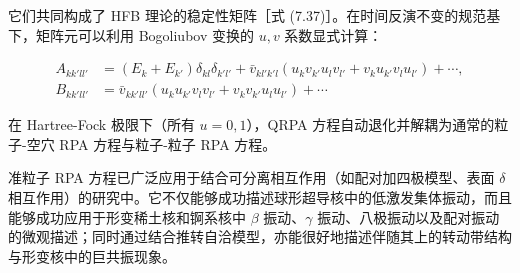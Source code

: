 它们共同构成了 HFB 理论的稳定性矩阵［式 (7.37)］。在时间反演不变的规范基下，矩阵元可以利用 Bogoliubov 变换的
$u,v$ 系数显式计算：

\begin{align}
A_{kk'll'} & =(E_{k}+E_{k'})\delta_{kl}\delta_{k'l'}+\bar{v}_{kl'k'l}(u_{k}v_{k'}u_{l}v_{l'}+v_{k}u_{k'}v_{l}u_{l'})+\cdots,\nonumber \\
B_{kk'll'} & =\bar{v}_{kk'll'}(u_{k}u_{k'}v_{l}v_{l'}+v_{k}v_{k'}u_{l}u_{l'})+\cdots\label{eq:qrpa_uv_coefficients_explicit}
\end{align}

在 Hartree-Fock 极限下（所有 $u=0,1$），QRPA 方程自动退化并解耦为通常的粒子-空穴 RPA 方程与粒子-粒子
RPA 方程。

准粒子 RPA 方程已广泛应用于结合可分离相互作用（如配对加四极模型、表面 $\delta$ 相互作用）的研究中。它不仅能够成功描述球形超导核中的低激发集体振动，而且能够成功应用于形变稀土核和锕系核中
$\beta$ 振动、$\gamma$ 振动、八极振动以及配对振动的微观描述；同时通过结合推转自洽模型，亦能很好地描述伴随其上的转动带结构与形变核中的巨共振现象。
